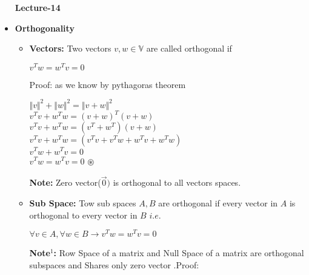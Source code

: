 \documentclass[a4paper,11pt]{article}
\numberwithin{equation}{section}
\begin{document}
\begin{itemize}
\begin{center}
    \Huge{\textbf{Lecture-14}}
\end{center}
\vspace{5pt}


\item  \textbf{Orthogonality }
    \begin{itemize}
        \item \textbf{Vectors: }Two vectors $v,w\in \mathbb{V}$ are called orthogonal if
        \begin{center}
            $v^Tw=w^Tv=0$\\         
        \end{center}
    Proof: as we know by pythagoras theorem
    \begin{center}
        ${\Vert v\Vert}^2+{\Vert w\Vert}^2={\Vert v+w\Vert}^2$\\
        \vspace{3pt}
        $ {v^Tv}+{w^Tw}={(v+w)^T(v+w)}$\\
        \vspace{3pt}
        $ {v^Tv}+{w^Tw}={(v^T+w^T)(v+w)}$\\
        \vspace{3pt}
        $ {v^Tv}+{w^Tw}={(v^Tv+v^Tw+w^Tv+w^Tw)}$\\
        \vspace{3pt}
        ${v^Tw+w^Tv=0}$\\
        \vspace{3pt}
        $v^Tw=w^Tv=0$ $\circledast $
    \end{center}
\textbf{Note: }Zero vector($\vec{0})$ is orthogonal to all vectors spaces. \\

    \item \textbf{Sub Space: }Tow sub spaces $A,B$ are orthogonal if every vector in $A$ is orthogonal to every vector in $B$ $i.e$.
    \begin{center}
        $\forall v\in A,\forall w\in B \rightarrow v^Tw=w^Tv=0$
    \end{center}

\textbf{Note$^1$: }Row Space of a matrix and Null Space of a matrix are orthogonal subspaces and Shares only zero vector .Proof:


\end{itemize}
\end{itemize}
\end{document}

